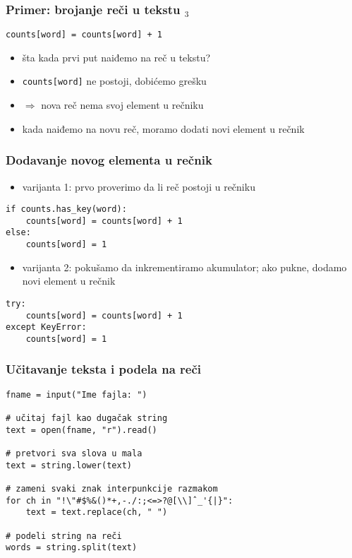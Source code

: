 \documentclass[utf8,compress,aspectratio=169]{beamer}
\begin{document}
\begin{frame}[fragile]
  \frametitle{Primer: brojanje reči u tekstu $_3$}
\begin{verbatim}
counts[word] = counts[word] + 1
\end{verbatim}
  \begin{itemize}
    \item šta kada prvi put naiđemo na reč u tekstu?
    \item \texttt{counts[word]} ne postoji, dobićemo grešku
    \item $\Rightarrow$ nova reč nema svoj element u rečniku
    \item kada naiđemo na novu reč, moramo dodati novi element u rečnik
  \end{itemize}
\end{frame}

\begin{frame}[fragile]
  \frametitle{Dodavanje novog elementa u rečnik}
  \begin{itemize}
    \item varijanta 1: prvo proverimo da li reč postoji u rečniku
  \end{itemize}
\begin{verbatim}
if counts.has_key(word):
    counts[word] = counts[word] + 1
else:
    counts[word] = 1
\end{verbatim}
  \begin{itemize}
    \item varijanta 2: pokušamo da inkrementiramo akumulator;
    ako pukne, dodamo novi element u rečnik
  \end{itemize}
\begin{verbatim}
try:
    counts[word] = counts[word] + 1
except KeyError:
    counts[word] = 1
\end{verbatim}
\end{frame}

\begin{frame}[fragile]
  \frametitle{Učitavanje teksta i podela na reči}
\begin{verbatim}
fname = input("Ime fajla: ")

# učitaj fajl kao dugačak string
text = open(fname, "r").read()

# pretvori sva slova u mala
text = string.lower(text)

# zameni svaki znak interpunkcije razmakom
for ch in "!\"#$%&()*+,-./:;<=>?@[\\]ˆ_'{|}":
    text = text.replace(ch, " ")

# podeli string na reči
words = string.split(text)
\end{verbatim}
\end{frame}
\end{document}
